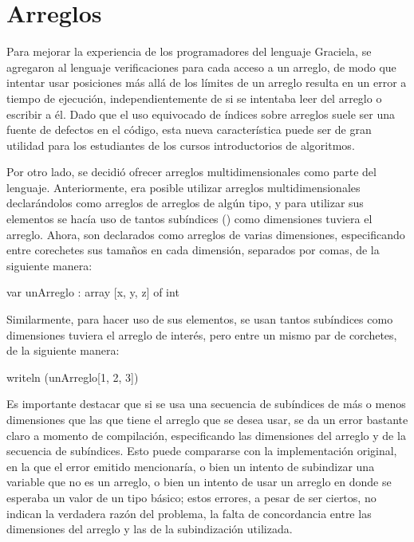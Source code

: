 \section{Arreglos}

Para mejorar la experiencia de los programadores del lenguaje Graciela, se
agregaron al lenguaje verificaciones para cada acceso a un arreglo, de modo que
intentar usar posiciones más allá de los límites de un arreglo resulta en un
error a tiempo de ejecución, independientemente de si se intentaba leer del
arreglo o escribir a él. Dado que el uso equivocado de índices sobre arreglos
suele ser una fuente de defectos en el código, esta nueva característica puede
ser de gran utilidad para los estudiantes de los cursos introductorios de
algoritmos.

Por otro lado, se decidió ofrecer arreglos multidimensionales como parte del
lenguaje. Anteriormente, era posible utilizar arreglos multidimensionales
declarándolos como arreglos de arreglos de algún tipo, y para utilizar sus
elementos se hacía uso de tantos subíndices (\ingra{[i]}) como dimensiones
tuviera el arreglo. Ahora, son declarados como arreglos de varias dimensiones,
especificando entre corechetes sus tamaños en cada dimensión, separados por
comas, de la siguiente manera:

\begin{gracielacode}
var unArreglo : array [x, y, z] of int
\end{gracielacode}

Similarmente, para hacer uso de sus elementos, se usan tantos subíndices como
dimensiones tuviera el arreglo de interés, pero entre un mismo par de corchetes,
de la siguiente manera:

\begin{gracielacode}
writeln (unArreglo[1, 2, 3])
\end{gracielacode}

Es importante destacar que si se usa una secuencia de subíndices de más o menos
dimensiones que las que tiene el arreglo que se desea usar, se da un error
bastante claro a momento de compilación, especificando las dimensiones del
arreglo y de la secuencia de subíndices. Esto puede compararse con la
implementación original, en la que el error emitido mencionaría, o bien un
intento de subindizar una variable que no es un arreglo, o bien un intento de
usar un arreglo en donde se esperaba un valor de un tipo básico; estos errores,
a pesar de ser ciertos, no indican la verdadera razón del problema, la falta de
concordancia entre las dimensiones del arreglo y las de la subindización
utilizada.

